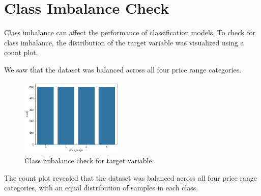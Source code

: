 \documentclass[12pt]{report}
\begin{document}
\section{Class Imbalance Check}
Class imbalance can affect the performance of classification models. To check for class imbalance, the distribution of the target variable was visualized using a count plot. 

We saw that the dataset was balanced across all four price range categories.
\begin{figure}[H]
	\centering
	\includegraphics[height=10em]{imbalance_check.png}
	\caption{Class imbalance check for target variable.}
	\label{imbalance_check}
\end{figure}
The count plot revealed that the dataset was balanced across all four price range categories, with an equal distribution of samples in each class.
\end{document}

